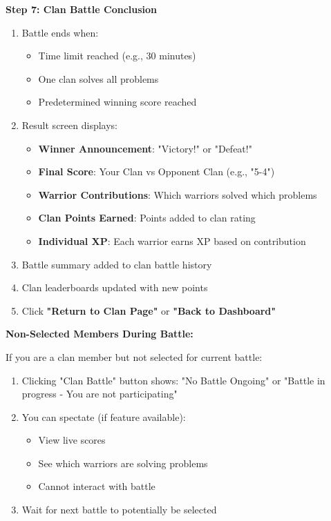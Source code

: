 \documentclass[12pt,a4paper]{article}
\begin{document}
\textbf{Step 7: Clan Battle Conclusion}
\begin{enumerate}
\item Battle ends when:
  \begin{itemize}
    \item Time limit reached (e.g., 30 minutes)
    \item One clan solves all problems
    \item Predetermined winning score reached
  \end{itemize}
\item Result screen displays:
  \begin{itemize}
    \item \textbf{Winner Announcement}: "Victory!" or "Defeat!"
    \item \textbf{Final Score}: Your Clan vs Opponent Clan (e.g., "5-4")
    \item \textbf{Warrior Contributions}: Which warriors solved which problems
    \item \textbf{Clan Points Earned}: Points added to clan rating
    \item \textbf{Individual XP}: Each warrior earns XP based on contribution
  \end{itemize}
\item Battle summary added to clan battle history
\item Clan leaderboards updated with new points
\item Click \textbf{"Return to Clan Page"} or \textbf{"Back to Dashboard"}
\end{enumerate}

\textbf{Non-Selected Members During Battle:}

If you are a clan member but not selected for current battle:
\begin{enumerate}
\item Clicking "Clan Battle" button shows: "No Battle Ongoing" or "Battle in progress - You are not participating"
\item You can spectate (if feature available):
  \begin{itemize}
    \item View live scores
    \item See which warriors are solving problems
    \item Cannot interact with battle
  \end{itemize}
\item Wait for next battle to potentially be selected
\end{enumerate}
\end{document}
